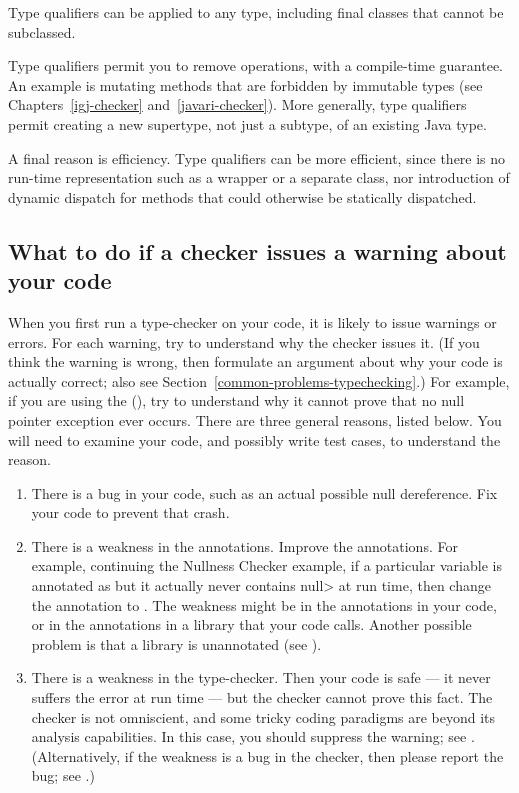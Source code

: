 Type qualifiers can be applied to any type, including final classes that
cannot be subclassed.

Type qualifiers permit you to remove operations, with a compile-time
guarantee.  An example is mutating methods that are forbidden by immutable
types (see Chapters~\ref{igj-checker} and~\ref{javari-checker}).  More
generally, type qualifiers permit creating a new supertype, not just a
subtype, of an existing Java type.

A final reason is efficiency.  Type qualifiers can be more
efficient, since there is no run-time representation such as a wrapper
or a separate class, nor introduction of dynamic dispatch for methods that
could otherwise be statically dispatched.


\subsection{What to do if a checker issues a warning about your code\label{handling-warnings}}

When you first run a type-checker on your code, it is likely to issue
warnings or errors.  For each warning, try to understand why the checker
issues it.  (If you think the warning is wrong, then formulate an argument
about why your code is actually correct; also see Section~\ref{common-problems-typechecking}.)  For example, if you are using the
(), try to understand why it cannot prove
that no null pointer exception ever occurs.  There are three general
reasons, listed below.  You will need to
examine your code, and possibly write test cases, to understand the reason.

\begin{enumerate}
\item
There is a bug in your code, such as an actual possible null dereference.
Fix your code to prevent that crash.

\item
There is a weakness in the annotations.  Improve the annotations.
For example, continuing the Nullness Checker example, if a particular
variable is annotated as  but it
actually never contains \<null> at run time, then change the annotation to 
.  The weakness might be in the
annotations in your code, or in the annotations in a library that your code
calls.  Another possible problem is that a library is unannotated (see
).

\item
There is a weakness in the type-checker.  Then your code is safe --- it never
suffers the error at run time --- but the checker cannot prove this
fact.  The checker is not omniscient, and some
tricky coding paradigms are beyond its analysis capabilities.  In this
case, you should suppress the warning; see
.  (Alternatively, if the weakness is
a bug in the checker, then  please report the bug; see
.)
\end{enumerate}

